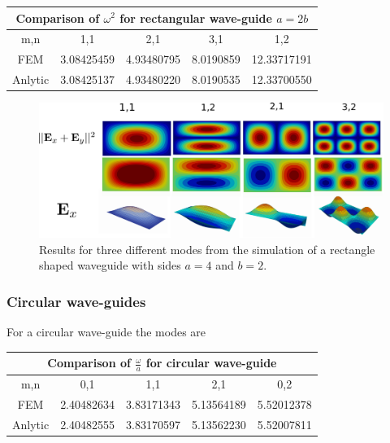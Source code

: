 \begin{center}
\begin{tabular}{|c|c|c|c|c|}
\hline
\multicolumn{5}{|c|}{Comparison of $\omega^2$ for rectangular wave-guide $a =2b$} \\
\hline 
m,n & 1,1 & 2,1 & 3,1 & 1,2 \\ 
\hline 
FEM     & 3.08425459 & 4.93480795 & 8.0190859 & 12.33717191 \\ 
\hline 
Anlytic & 3.08425137 & 4.93480220 & 8.0190535 & 12.33700550 \\ 
\hline 
\end{tabular} 
\label{tab:rec_wav_comparison}
\end{center}
\begin{figure}
\centering
\includegraphics[scale=0.1]{./img/rectangular_waveguide.pdf}
\caption{Results for three different modes from the simulation of a rectangle shaped waveguide with sides $a=4$ and $b=2$.}
\label{fig:rectangular_waveguide}
\end{figure}


\subsubsection{Circular wave-guides}

For a circular wave-guide the modes are 

\begin{center}
\begin{tabular}{|c|c|c|c|c|}
\hline
\multicolumn{5}{|c|}{Comparison of $\frac{\omega}{a}$ for circular wave-guide} \\
\hline 
m,n & 0,1 & 1,1 & 2,1 & 0,2 \\ 
\hline 
FEM     & 2.40482634 & 3.83171343 & 5.13564189 & 5.52012378 \\ 
\hline 
Anlytic & 2.40482555 & 3.83170597 & 5.13562230 & 5.52007811 \\ 
\hline 
\end{tabular} 
\label{tab:cir_wav_comparison}
\end{center}

